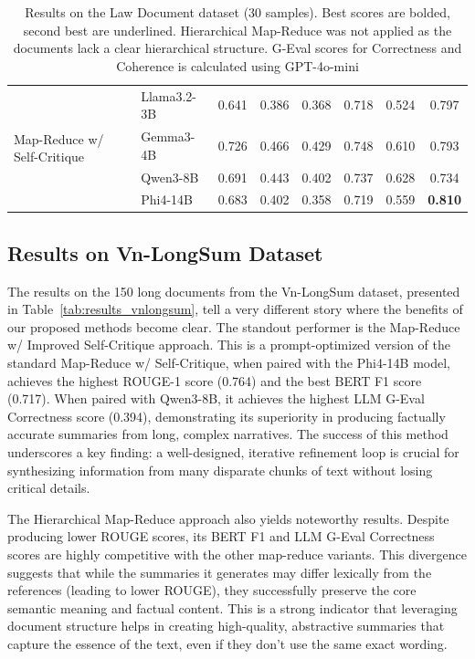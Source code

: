 \documentclass[11pt]{article}
\begin{document}
\begin{table}[htbp]
\begin{tabular}{llcccccc}
\midrule
\multirow{4}{*}{Map-Reduce w/ Self-Critique} & Llama3.2-3B & 0.641 & 0.386 & 0.368 & 0.718 & 0.524 & 0.797 \\
& Gemma3-4B & 0.726 & 0.466 & 0.429 & 0.748 & 0.610 & 0.793 \\
& Qwen3-8B & 0.691 & 0.443 & 0.402 & 0.737 & 0.628 & 0.734 \\
& Phi4-14B & 0.683 & 0.402 & 0.358 & 0.719 & 0.559 & \textbf{0.810} \\
\bottomrule
\end{tabular}
\caption{Results on the Law Document dataset (30 samples). Best scores are bolded, second best are underlined. Hierarchical Map-Reduce was not applied as the documents lack a clear hierarchical structure. G-Eval scores for Correctness and Coherence is calculated using GPT-4o-mini}
\label{tab:results_law}
\end{table}

\subsection{Results on Vn-LongSum Dataset}
The results on the 150 long documents from the Vn-LongSum dataset, presented in Table~\ref{tab:results_vnlongsum}, tell a very different story where the benefits of our proposed methods become clear. The standout performer is the Map-Reduce w/ Improved Self-Critique approach. This is a prompt-optimized version of the standard Map-Reduce w/ Self-Critique, when paired with the Phi4-14B model, achieves the highest ROUGE-1 score (0.764) and the best BERT F1 score (0.717). When paired with Qwen3-8B, it achieves the highest LLM G-Eval Correctness score (0.394), demonstrating its superiority in producing factually accurate summaries from long, complex narratives. The success of this method underscores a key finding: a well-designed, iterative refinement loop is crucial for synthesizing information from many disparate chunks of text without losing critical details.

The Hierarchical Map-Reduce approach also yields noteworthy results. Despite producing lower ROUGE scores, its BERT F1 and LLM G-Eval Correctness scores are highly competitive with the other map-reduce variants. This divergence suggests that while the summaries it generates may differ lexically from the references (leading to lower ROUGE), they successfully preserve the core semantic meaning and factual content. This is a strong indicator that leveraging document structure helps in creating high-quality, abstractive summaries that capture the essence of the text, even if they don't use the same exact wording.
\end{document}
